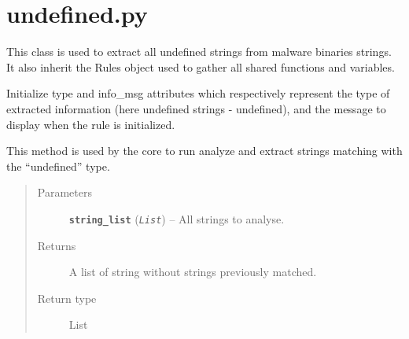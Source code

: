 \documentclass[letterpaper,10pt,oneside]{sphinxmanual}
\begin{document}
\section{undefined.py}
\label{index:undefined-py}\label{index:module-lib.allRules.undefined}

\begin{fulllineitems}
\label{index:lib.allRules.undefined.Undefined}
This class is used to extract all undefined strings from malware
binaries strings. It also inherit the Rules object used to gather
all shared functions and variables.

\begin{fulllineitems}
\label{index:lib.allRules.undefined.Undefined.__init__}
Initialize type and info\_msg attributes which respectively represent
the type of extracted information (here undefined strings - undefined),
and the message to display when the rule is initialized.

\end{fulllineitems}


\begin{fulllineitems}
\label{index:lib.allRules.undefined.Undefined.run_analysis}
This method is used by the core to run analyze and extract strings
matching with the ``undefined'' type.
\begin{quote}\begin{description}
\item[{Parameters}] \leavevmode
\textbf{\texttt{string\_list}} (\emph{\texttt{List}}) -- All strings to analyse.

\item[{Returns}] \leavevmode
A list of string without strings previously matched.

\item[{Return type}] \leavevmode
List

\end{description}\end{quote}

\end{fulllineitems}


\end{fulllineitems}
\end{document}
